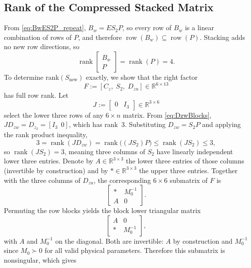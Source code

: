 \documentclass[11pt]{article}
\newcommand{\R}{\mathbb{R}}
\newcommand{\rank}{\operatorname{rank}}
\begin{document}
\subsection{Rank of the Compressed Stacked Matrix}
From \eqref{eq:BwES2P_repeat}, $B_w = ES_2P$, so every row of $B_w$ is a 
linear combination of rows of $P$, and therefore $\operatorname{row}(B_w) 
\subseteq \operatorname{row}(P)$. Stacking adds no new row directions, so
\begin{equation}
    \rank\!\begin{bmatrix} B_w \\ P \end{bmatrix} = \rank(P) = 4.
    \label{eq:rankBwP}
\end{equation}
To determine rank$(S_\text{new})$ exactly, we show that the right factor
\begin{equation}
    F := [C_z,\; S_2,\; D_{zu}] \in \R^{6\times 13}
    \label{eq:Fdef}
\end{equation}
has full row rank. Let
\begin{equation}
    J := \begin{bmatrix} 0 & I_3 \end{bmatrix} \in \R^{3\times 6}
    \label{eq:Jdef}
\end{equation}
select the lower three rows of any $6\times n$ matrix. From 
\eqref{eq:DzwBlocks}, $J D_{zw} = D_{z_2} = [I_3\ \ 0]$, which has rank~$3$. 
Substituting $D_{zw} = S_2 P$ and applying the rank product inequality,
\begin{equation}
    3 = \rank(J D_{zw}) = \rank\!\bigl((J S_2) P\bigr) \leq \rank(J S_2) \leq 3,
    \label{eq:rankJS2}
\end{equation}
so $\rank(J S_2) = 3$, meaning three columns of $S_2$ have linearly independent 
lower three entries. Denote by $A \in \R^{3\times 3}$ the lower three entries 
of those columns (invertible by construction) and by $* \in \R^{3\times 3}$ 
the upper three entries. Together with the three columns of $D_{zu}$, the 
corresponding $6\times 6$ submatrix of $F$ is
\begin{equation}
    \begin{bmatrix} * & M_0^{-1} \\ A & 0 \end{bmatrix}.
    \label{eq:submat}
\end{equation}
Permuting the row blocks yields the block lower triangular matrix
\begin{equation}
    \begin{bmatrix} A & 0 \\ * & M_0^{-1} \end{bmatrix},
    \label{eq:submatperm}
\end{equation}
with $A$ and $M_0^{-1}$ on the diagonal. Both are invertible: $A$ by 
construction and $M_0^{-1}$ since $M_0 \succ 0$ for all valid physical 
parameters. Therefore this submatrix is nonsingular, which gives
\end{document}
